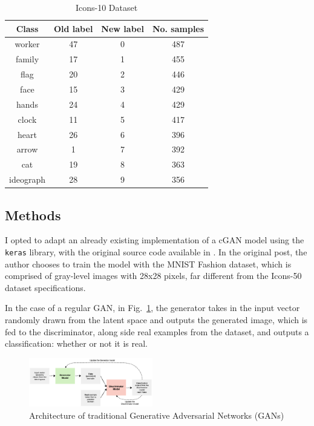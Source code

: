 \documentclass[conference]{IEEEtran}
\begin{document}
\begin{table}[htbp]
    \centering
    \caption{Icons-10 Dataset}
    \begin{tabular}{cccc}
    \hline
    \textbf{Class} & \textbf{Old label} & \textbf{New label} & \textbf{No. samples} \\ \hline
    worker & 47 & 0 & 487  \\ 
    family & 17 & 1 & 455  \\
    flag & 20 & 2 & 446  \\
    face & 15 & 3 & 429  \\
    hands & 24 & 4 & 429  \\
    clock & 11 & 5 & 417  \\
    heart & 26 & 6 & 396  \\
    arrow & 1 & 7 & 392  \\
    cat & 19 & 8 & 363  \\
    ideograph & 28 & 9 & 356 \\ \hline
    \end{tabular}
    \label{tab:Icons10Desc}
\end{table}

\subsection{Methods}
I opted to adapt an already existing implementation of a cGAN model using the \texttt{keras} library, with the original source code available in \cite{BrownleeCGAN, BrownleeGAN}. In the original post, the author chooses to train the model with the MNIST Fashion dataset, which is comprised of gray-level images with 28x28 pixels, far different from the Icons-50 dataset specifications.

In the case of a regular GAN, in Fig.~\ref{fig:GANArch}, the generator takes in the input vector randomly drawn from the latent space and outputs the generated image, which is fed to the discriminator, along side real examples from the dataset, and outputs a classification: whether or not it is real.

\begin{figure}[htbp]
    \centering
    \includegraphics[width=0.48\textwidth]{paper/images/architecture/gan_arch.png}
    \caption{Architecture of traditional Generative Adversarial Networks (GANs)}
    \label{fig:GANArch}
\end{figure}
\end{document}
